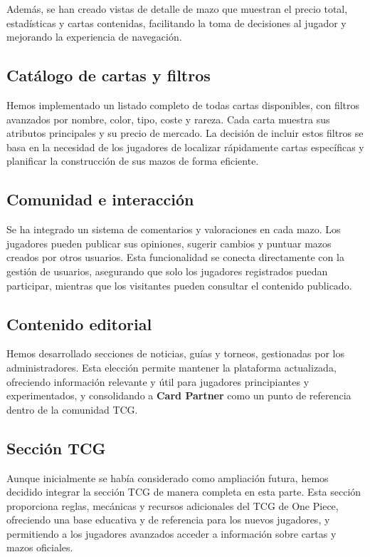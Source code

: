 \documentclass[10pt]{article}
\begin{document}
			Además, se han creado vistas de detalle de mazo que muestran el precio total, estadísticas y cartas contenidas, facilitando la toma de decisiones al jugador y mejorando la experiencia de navegación.

		\subsection{Catálogo de cartas y filtros}
			Hemos implementado un listado completo de todas cartas disponibles, con filtros avanzados por nombre, color, tipo, coste y rareza. Cada carta muestra sus atributos principales y su precio de mercado. La decisión de incluir estos filtros se basa en la necesidad de los jugadores de localizar rápidamente cartas específicas y planificar la construcción de sus mazos de forma eficiente.

		\subsection{Comunidad e interacción}
			Se ha integrado un sistema de comentarios y valoraciones en cada mazo. Los jugadores pueden publicar sus opiniones, sugerir cambios y puntuar mazos creados por otros usuarios. Esta funcionalidad se conecta directamente con la gestión de usuarios, asegurando que solo los jugadores registrados puedan participar, mientras que los visitantes pueden consultar el contenido publicado.

		\subsection{Contenido editorial}
			Hemos desarrollado secciones de noticias, guías y torneos, gestionadas por los administradores. Esta elección permite mantener la plataforma actualizada, ofreciendo información relevante y útil para jugadores principiantes y experimentados, y consolidando a \textbf{Card Partner} como un punto de referencia dentro de la comunidad TCG.

		\subsection{Sección TCG}
			Aunque inicialmente se había considerado como ampliación futura, hemos decidido integrar la sección TCG de manera completa en esta parte. Esta sección proporciona reglas, mecánicas y recursos adicionales del TCG de One Piece, ofreciendo una base educativa y de referencia para los nuevos jugadores, y permitiendo a los jugadores avanzados acceder a información sobre cartas y mazos oficiales.
\end{document}
